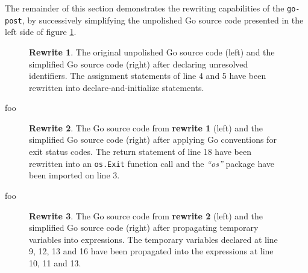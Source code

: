 The remainder of this section demonstrates the rewriting capabilities of the \texttt{go-post}, by successively simplifying the unpolished Go source code presented in the left side of figure \ref{fig:rewrite_1}.

\begin{figure}[htbp]
	\centering
	\begin{subfigure}[t]{0.45\textwidth}
		
	\end{subfigure}
	\qquad
	\begin{subfigure}[t]{0.45\textwidth}
		
	\end{subfigure}
	\caption{\textbf{Rewrite 1}. The original unpolished Go source code (left) and the simplified Go source code (right) after declaring unresolved identifiers. The assignment statements of line 4 and 5 have been rewritten into declare-and-initialize statements.}
	\label{fig:rewrite_1}
\end{figure}

foo

\begin{figure}[htbp]
	\centering
	\begin{subfigure}[t]{0.45\textwidth}
		
	\end{subfigure}
	\qquad
	\begin{subfigure}[t]{0.45\textwidth}
		
	\end{subfigure}
	\caption{\textbf{Rewrite 2}. The Go source code from \textbf{rewrite 1} (left) and the simplified Go source code (right) after applying Go conventions for exit status codes. The return statement of line 18 have been rewritten into an \texttt{os.Exit} function call and the \textit{``os''} package have been imported on line 3.}
	\label{fig:rewrite_2}
\end{figure}

foo

\begin{figure}[htbp]
	\centering
	\begin{subfigure}[t]{0.45\textwidth}
		
	\end{subfigure}
	\qquad
	\begin{subfigure}[t]{0.45\textwidth}
		
	\end{subfigure}
	\caption{\textbf{Rewrite 3}. The Go source code from \textbf{rewrite 2} (left) and the simplified Go source code (right) after propagating temporary variables into expressions. The temporary variables declared at line 9, 12, 13 and 16 have been propagated into the expressions at line 10, 11 and 13.}
	\label{fig:rewrite_3}
\end{figure}

